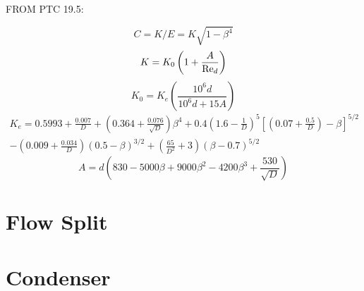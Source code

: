 
FROM PTC 19.5:

\begin{equation}
C = K/E = K\sqrt{1-\beta^4}
\end{equation}
\begin{equation}
K = K_0 \left(1+\frac{A}{\text{Re}_d}\right)
\end{equation}
\begin{equation}
K_0=K_e \left(\frac{10^6 d}{10^6 d + 15A}\right)
\end{equation}
\begin{multline}
K_e = 0.5993 + \frac{0.007}{D} + \left(0.364 + \frac{0.076}{\sqrt{D}}\right)\beta^4 
      + 0.4\left(1.6 - \frac{1}{D}\right)^5 \left[\left(0.07 + \frac{0.5}{D}\right) - \beta\right]^{5/2} \\
      - \left(0.009 + \frac{0.034}{D}\right) \left(0.5 - \beta\right)^{3/2} 
      + \left(\frac{65}{D^2} + 3\right)\left(\beta - 0.7\right)^{5/2}
\end{multline}
\begin{equation}
A = d\left(830 - 5000\beta + 9000\beta^2 - 4200\beta^3 + \frac{530}{\sqrt{D}}\right)
\end{equation}

\section{Flow Split} \label{sec:FlowSplit}

\section{Condenser} \label{sec:Condenser}

